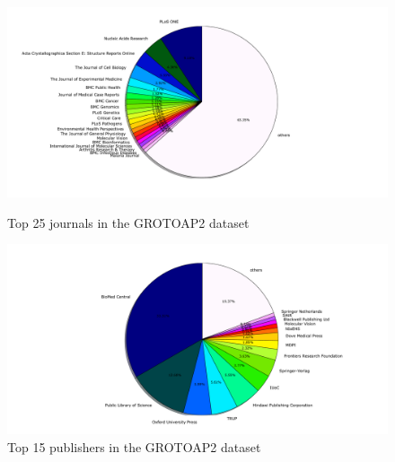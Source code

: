   \begin{figure}
  \centering
\begin{minipage}[t!]{\linewidth}
  \centerline{\includegraphics[width=22cm]{plots/journals_pieplot}}
  \caption{Top 25 journals in the GROTOAP2 dataset}
  \label{fig:journals_pieplot}
\end{minipage}
\quad
\begin{minipage}[t!]{\linewidth}
  \centerline{\includegraphics[width=22cm]{plots/publishers_pieplot}}
  \caption{Top 15 publishers in the GROTOAP2 dataset}
  \label{fig:publishers_pieplot}
\end{minipage}
\end{figure}

